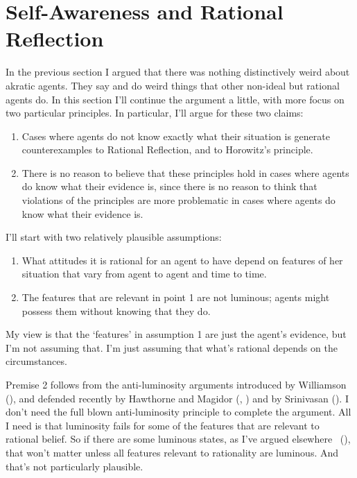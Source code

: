 \documentclass[
  10pt,
  letterpaper,
  twoside]{scrbook}
\providecommand{\tightlist}{%
  \setlength{\itemsep}{0pt}\setlength{\parskip}{0pt}}\usepackage{longtable,booktabs,array}
\begin{document}
\section{Self-Awareness and Rational
Reflection}\label{self-awarenessandrationalreflection}

In the previous section I argued that there was nothing distinctively
weird about akratic agents. They say and do weird things that other
non-ideal but rational agents do. In this section I'll continue the
argument a little, with more focus on two particular principles. In
particular, I'll argue for these two claims:

\begin{enumerate}
\def\labelenumi{\arabic{enumi}.}
\tightlist
\item
  Cases where agents do not know exactly what their situation is
  generate counterexamples to Rational Reflection, and to Horowitz's
  principle.
\item
  There is no reason to believe that these principles hold in cases
  where agents do know what their evidence is, since there is no reason
  to think that violations of the principles are more problematic in
  cases where agents do know what their evidence is.
\end{enumerate}

I'll start with two relatively plausible assumptions:

\begin{enumerate}
\def\labelenumi{\arabic{enumi}.}
\tightlist
\item
  What attitudes it is rational for an agent to have depend on features
  of her situation that vary from agent to agent and time to time.
\item
  The features that are relevant in point 1 are not luminous; agents
  might possess them without knowing that they do.
\end{enumerate}

My view is that the `features' in assumption 1 are just the agent's
evidence, but I'm not assuming that. I'm just assuming that what's
rational depends on the circumstances.

Premise 2 follows from the anti-luminosity arguments introduced by
Williamson (), and defended recently
by Hawthorne and Magidor (,
) and by Srinivasan
(). I don't need the full blown
anti-luminosity principle to complete the argument. All I need is that
luminosity fails for some of the features that are relevant to rational
belief. So if there are some luminous states, as I've argued elsewhere
~(), that won't matter
unless all features relevant to rationality are luminous. And that's not
particularly plausible.
\end{document}
